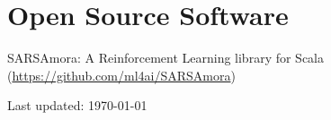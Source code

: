 \documentclass[letterpaper]{article}
\def\footerlink{http://jblevins.org/projects/cv-template/}
\renewenvironment{itemize}{
  \begin{list}{}{
    \setlength{\leftmargin}{1.5em}
  }
}{
  \end{list}
}
\begin{document}
\section*{Open Source Software}
\begin{itemize}
	\item SARSAmora: A Reinforcement Learning library for Scala (\url{https://github.com/ml4ai/SARSAmora})
\end{itemize}
\bigskip

\begin{center}
  \begin{footnotesize}
    Last updated: \today \\
  \end{footnotesize}
\end{center}
\end{document}
